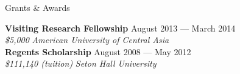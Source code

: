 \documentclass{resume} %
\begin{document}
\begin{minipage}{\textwidth}
\begin{rSection}{Grants \& Awards}

{\bf Visiting Research Fellowship} \hfill {August 2013 --- March 2014} \\
{\em \$5,000} \hfill {\em American University of Central Asia} \\


{\bf Regents Scholarship} \hfill {August 2008 --- May 2012} \\
{\em \$111,140 (tuition)} \hfill {\em Seton Hall University} \\



\end{rSection}
\end{minipage}



\end{document}
